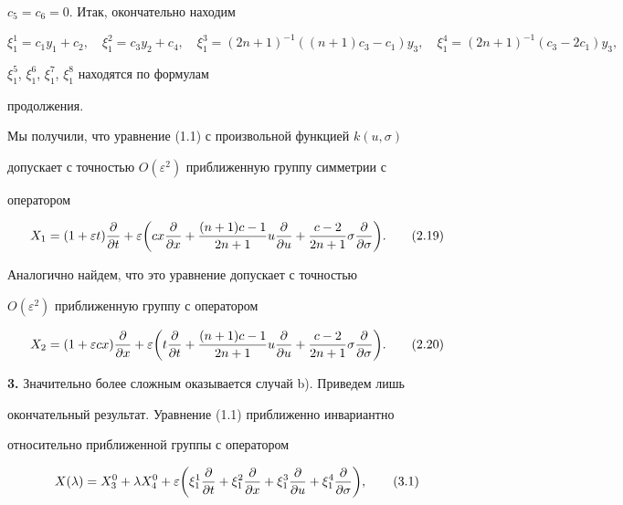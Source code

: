 $c_5=c_6=0$. Итак, окончательно находим


$$


\xi^1_1=c_1y_1+c_2,\quad \xi^2_1=c_3y_2+c_4,\quad


\xi^3_1=(2n+1)^{-1}((n+1)c_3-c_1)y_3,\quad


\xi^4_1=(2n+1)^{-1}(c_3-2c_1)y_3,


$$


$\xi^5_1$, $\xi^6_1$, $\xi^7_1$, $\xi^8_1$ находятся по формулам


продолжения.





Мы получили, что уравнение (1.1) с произвольной функцией $k(u,\sigma)$


допускает с точностью $O(\varepsilon^2)$ приближенную группу симметрии с


оператором


\begin{equation}


X_1=(1+\varepsilon t)\frac{\pa}{\pa t}+\varepsilon\biggl(


cx\frac{\pa}{\pa x}+\frac{(n+1)c-1}{2n+1}u\frac{\pa}{\pa u}+


\frac{c-2}{2n+1}\sigma\frac{\pa}{\pa\sigma}\biggr).\tag{2.19}


\end{equation}


Аналогично найдем, что это уравнение допускает с точностью


$O(\varepsilon^2)$ приближенную группу с оператором


\begin{equation}


X_2=(1+\varepsilon cx)\frac{\pa}{\pa x}+\varepsilon\biggl(


t\frac{\pa}{\pa t}+\frac{(n+1)c-1}{2n+1}u\frac{\pa}{\pa u}+


\frac{c-2}{2n+1}\sigma\frac{\pa}{\pa\sigma}\biggr).\tag{2.20}


\end{equation}





{\bf 3.} Значительно более сложным оказывается случай b). Приведем лишь


окончательный результат. Уравнение (1.1) приближенно инвариантно


относительно приближенной группы с оператором


\begin{equation}


X(\lambda)=X^0_3+\lambda X^0_4+\varepsilon\biggl(


\xi^1_1\frac{\pa}{\pa t}+\xi^2_1\frac{\pa}{\pa x}


+\xi^3_1\frac{\pa}{\pa u}+\xi^4_1\frac{\pa}{\pa\sigma}\biggr),


\tag{3.1}


\end{equation}


